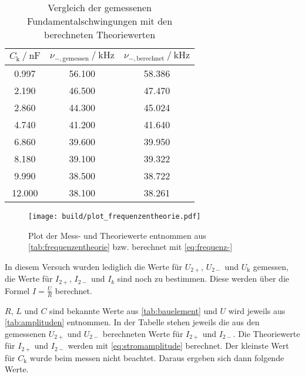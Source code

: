 \begin{table}
  \centering
  \caption{Vergleich der gemessenen Fundamentalschwingungen mit den berechneten Theoriewerten}
  \label{tab:frequenzentheorie}
  \begin{tabular}{c c c}
    \toprule 
    $C_\text{k} \:/\: \si{\nano\farad}$ & $\nu _{-,\text{gemessen}} \:/\: \si{\kilo\hertz}$ & $\nu _{-,\text{berechnet}} \:/\: \si{\kilo\hertz}$    \\ 
    \midrule 
    0.997 & 56.100 & 58.386 \\
    2.190 & 46.500 & 47.470 \\
    2.860 & 44.300 & 45.024 \\
    4.740 & 41.200 & 41.640 \\
    6.860 & 39.600 & 39.950 \\
    8.180 & 39.100 & 39.322 \\
    9.990 & 38.500 & 38.722 \\
    12.000 & 38.100 & 38.261 \\
    \bottomrule
  \end{tabular}
\end{table}

\begin{figure}
    \centering
    \texttt{[image: build/plot\_frequenzentheorie.pdf]}
    \caption{Plot der Mess- und Theoriewerte entnommen aus \autoref{tab:frequenzentheorie} bzw. berechnet mit \autoref{eq:frequenz-}}
    \label{fig:frequenzenthorie_plot}
\end{figure}

\FloatBarrier

In diesem Versuch wurden lediglich die Werte für $U_{2+}$, $U_{2-}$ und $U_\text{k}$ gemessen, die Werte für $I_{2+}$, $I_{2-}$ und $I_k$ sind noch zu bestimmen. Diese werden über die Formel $I = \frac{U}{R}$ berechnet.

$R$, $L$ und $C$ sind bekannte Werte aus \autoref{tab:bauelement} und $U$ wird jeweils aus \autoref{tab:amplituden} entnommen. In der Tabelle stehen jeweils die aus den gemessenen $U_{2+}$ und $U_{2-}$ berechneten Werte für $I_{2+}$ und $I_{2-}$. Die Theoriewerte für $I_{2+}$ und $I_{2-}$ werden mit \autoref{eq:stromamplitude} berechnet. Der kleinste Wert für $C_\text{k}$ wurde beim messen nicht beachtet. Daraus ergeben sich dann folgende Werte.

